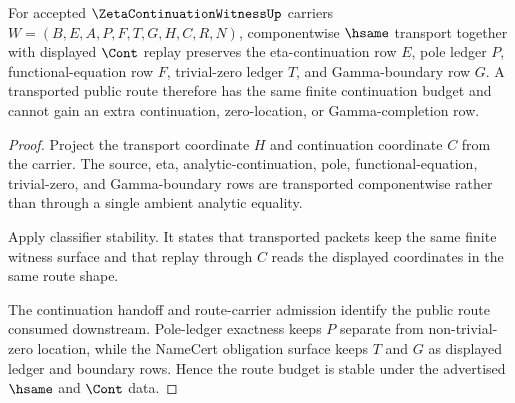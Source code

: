 \begin{theorem}
\label{thm:zeta-continuation-witness-route-stability-budget}
For accepted $\ZetaContinuationWitnessUp$ carriers $W=(B,E,A,P,F,T,G,H,C,R,N)$, componentwise $\hsame$ transport together with displayed $\Cont$ replay preserves the eta-continuation row $E$, pole ledger $P$, functional-equation row $F$, trivial-zero ledger $T$, and Gamma-boundary row $G$. A transported public route therefore has the same finite continuation budget and cannot gain an extra continuation, zero-location, or Gamma-completion row.
\end{theorem}
\begin{proof}
Project the transport coordinate $H$ and continuation coordinate $C$ from the carrier. The source, eta, analytic-continuation, pole, functional-equation, trivial-zero, and Gamma-boundary rows are transported componentwise rather than through a single ambient analytic equality.

Apply classifier stability. It states that transported packets keep the same finite witness surface and that replay through $C$ reads the displayed coordinates in the same route shape.

The continuation handoff and route-carrier admission identify the public route consumed downstream. Pole-ledger exactness keeps $P$ separate from non-trivial-zero location, while the NameCert obligation surface keeps $T$ and $G$ as displayed ledger and boundary rows. Hence the route budget is stable under the advertised $\hsame$ and $\Cont$ data.
\end{proof}

